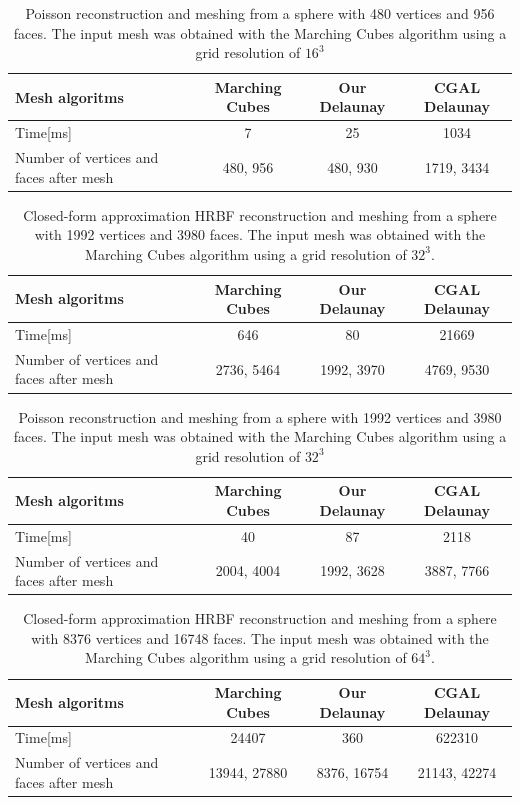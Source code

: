\documentclass{article}
\begin{document}
\begin{table}
 \caption{Poisson reconstruction and meshing from a sphere with 480 vertices and 956 faces. The input mesh was obtained with the Marching Cubes algorithm using a grid resolution of $16^3$}
\noindent
  \begin{tabular}{|l|c|c|c|} \hline
    Mesh algoritms & Marching Cubes & Our Delaunay & CGAL Delaunay \\  \hline
    Time[ms] & 7 & 25 & 1034\\ \hline
    Number of vertices and faces after mesh & 480, 956 & 480, 930 &1719, 3434 \\ \hline
  \end{tabular}
\end{table}

\begin{table}
 \caption{Closed-form approximation HRBF reconstruction and meshing from a sphere with 1992 vertices and 3980 faces. The input mesh was obtained with the Marching Cubes algorithm using a grid resolution of $32^3$.}
\noindent

  \begin{tabular}{|l|c|c|c|} \hline
    Mesh algoritms & Marching Cubes & Our Delaunay & CGAL Delaunay \\  \hline
    Time[ms] & 646 & 80 & 21669\\ \hline
    Number of vertices and faces after mesh & 2736, 5464 & 1992, 3970 &4769, 9530 \\ \hline
  \end{tabular}
\end{table}

\begin{table}
 \caption{Poisson reconstruction and meshing from a sphere with 1992 vertices and 3980 faces. The input mesh was obtained with the Marching Cubes algorithm using a grid resolution of $32^3$}
\noindent 
  \begin{tabular}{|l|c|c|c|} \hline
    Mesh algoritms & Marching Cubes & Our Delaunay & CGAL Delaunay \\  \hline
    Time[ms] & 40 & 87 & 2118\\ \hline
    Number of vertices and faces after mesh & 2004, 4004 & 1992, 3628 &3887, 7766 \\ \hline
  \end{tabular}
\end{table}

\begin{table}
 \caption{Closed-form approximation HRBF reconstruction and meshing from a sphere with 8376 vertices and 16748 faces. The input mesh was obtained with the Marching Cubes algorithm using a grid resolution of $64^3$.}
\noindent
  \begin{tabular}{|l|c|c|c|} \hline
    Mesh algoritms & Marching Cubes & Our Delaunay & CGAL Delaunay \\  \hline
    Time[ms] & 24407 & 360 & 622310\\ \hline
    Number of vertices and faces after mesh & 13944, 27880 & 8376, 16754 &21143, 42274 \\ \hline
  \end{tabular}
\end{table}
\end{document}
